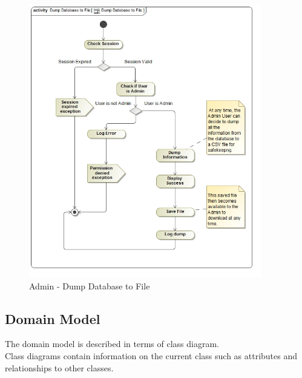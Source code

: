 \documentclass{article}
\begin{document}
			\begin{figure}[H]
				\includegraphics[width=4in, center]{../Diagrams/Process Specifications/Reporting subsystem/Dump Database to File.jpg}
				\caption{Admin - Dump Database to File}
			\end{figure}
			
		\cleardoublepage
		\subsection{Domain Model}\label{subsec:domainmodel}
		The domain model is described in terms of class diagram.\\ Class diagrams contain information on the current class such as attributes and relationships to other classes.
		
\end{document}
